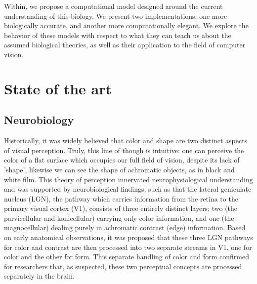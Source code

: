 \documentclass[journal,onecolumn]{IEEEtran}
\begin{document}
Within, we propose a computational model designed around the current understanding of this biology. We present two implementations, one more biologically accurate, and another more computationally elegant. We explore the behavior of these models with respect to what they can teach us about the assumed biological theories, as well as their application to the field of computer vision.


%
%
%
\section{State of the art}


\subsection{Neurobiology}

Historically, it was widely believed that color and shape are two distinct aspects of visual perception. Truly, this line of though is intuitive: one can perceive the color of a flat surface which occupies our full field of vision, despite its lack of 'shape', likewise we can see the shape of achromatic objects, as in black and white film. This theory of perception innervated neurophysiological understanding and was supported by neurobiological findings, such as that the lateral geniculate nucleus (LGN), the pathway which carries information from the retina to the primary visual cortex (V1), consists of three entirely distinct layers; two (the parvicellular and konicellular) carrying only color information, and one (the magnocellular) dealing purely in achromatic contrast (edge) information. Based on early anatomical observations, it was proposed that these three LGN pathways for color and contrast are then processed into two separate streams in V1, one for color and the other for form. This separate handling of color and form confirmed for researchers that, as suspected, these two perceptual concepts are processed separately in the brain.
\end{document}
